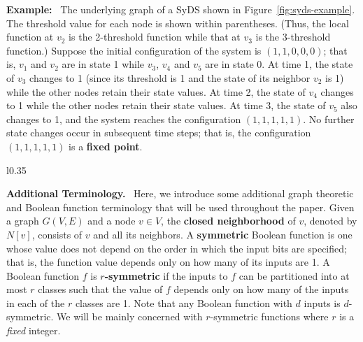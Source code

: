 \smallskip

\noindent
\textbf{Example:}~
The underlying graph of a SyDS shown in
Figure~\ref{fig:syds-example}.
The threshold value for each node is shown within parentheses. 
(Thus, the local function at $v_2$ is the 2-threshold function
while that at $v_3$ is the 3-threshold function.)
Suppose the initial configuration of the system is $(1, 1, 0, 0, 0)$;
that is,
$v_1$ and $v_2$ are in state 1 while 
$v_3$, $v_4$ and $v_5$ are in state 0. 
At time 1, the state of $v_3$ changes to 1 (since its threshold is 1
and the state of its neighbor $v_2$ is 1) while
the other nodes retain their state values.
At time 2, the state of $v_4$ changes to 1 
while the other nodes retain their state values.
At time 3, the state of $v_5$ also changes to 1,
and the system reaches the configuration $(1, 1, 1, 1, 1)$.
No further state changes occur in subsequent time steps;
that is, the configuration $(1, 1, 1, 1, 1)$ is a \textbf{fixed point}.

\smallskip

\begin{wrapfigure}[16]{l}{0.35\textwidth}
\centering

\caption{\small{An Example of a SyDS where each node has a
threshold function. The threshold values are shown in parentheses.}}
\label{fig:syds-example}
\smallskip
\end{wrapfigure}

\smallskip

\noindent
\textbf{Additional Terminology.}~ Here, we introduce some additional
graph theoretic and Boolean function terminology that will be used 
throughout the paper. 
Given a graph $G(V,E)$ and a node $v \in V$, the \textbf{closed neighborhood}
of $v$, denoted by $N[v]$, consists of $v$ and all its neighbors.
A \textbf{symmetric} Boolean function \cite{Crama-Hammer-2011}  is one whose
value does not depend on the order in
which the input bits are specified;
that is, the function value depends only on how many
of its inputs are 1.
A Boolean function $f$ is \textbf{$r$-symmetric} \cite{BH+07}
if the inputs to $f$ can be partitioned into at most $r$ classes
such that the value of $f$ depends only on how many of the
inputs in each of the $r$ classes are 1.
Note that any Boolean function with $d$ inputs is $d$-symmetric.
We will be mainly concerned with $r$-symmetric functions 
where $r$ is a \emph{fixed} integer.

